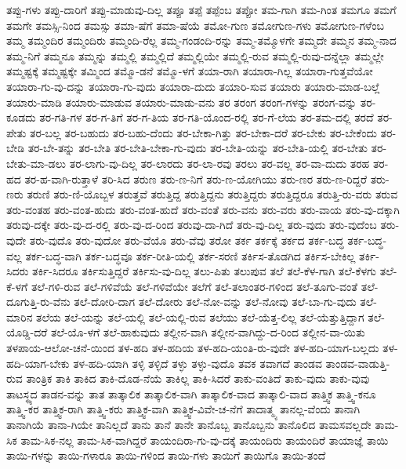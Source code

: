 {ತಪ್ಪು-ಗಳು
ತಪ್ಪು-ದಾರಿಗೆ
ತಪ್ಪು-ಮಾಡುವು-ದಿಲ್ಲ
ತಪ್ಪೂ
ತಪ್ಪೆ
ತಪ್ಪೆಂಬ
ತಪ್ಪೋ
ತಮ-ಗಾಗಿ
ತಮ-ಗಿಂತ
ತಮಗೂ
ತಮಗೆ
ತಮಗೇ
ತಮಸ್ಸಿ-ನಿಂದ
ತಮಸ್ಸು
ತಮಾ-ಷೆಗೆ
ತಮಾ-ಷೆಯೆ
ತಮೋ-ಗುಣ
ತಮೋಗುಣ-ಗಳು
ತಮೋಗುಣ-ಗಳೆಂಬ
ತಮ್ಮ
ತಮ್ಮಂದಿರ
ತಮ್ಮಂದಿರು
ತಮ್ಮಂದಿ-ರೆಲ್ಲ
ತಮ್ಮ-ಗಂಡಂದಿ-ರನ್ನು
ತಮ್ಮ-ತಮ್ಮೊಳಗೇ
ತಮ್ಮದೇ
ತಮ್ಮನ
ತಮ್ಮ-ನಾದ
ತಮ್ಮ-ನಿಗೆ
ತಮ್ಮನೂ
ತಮ್ಮನ್ನು
ತಮ್ಮಲ್ಲಿ
ತಮ್ಮಲ್ಲಿದೆ
ತಮ್ಮಲ್ಲಿಯೇ
ತಮ್ಮಲ್ಲಿ-ರುವ
ತಮ್ಮಲ್ಲಿ-ರುವು-ದನ್ನೆಲ್ಲಾ
ತಮ್ಮಲ್ಲೇ
ತಮ್ಮಷ್ಟಕ್ಕೆ
ತಮ್ಮಷ್ಟಕ್ಕೇ
ತಮ್ಮಿಂದ
ತಮ್ಮೊ-ಡನೆ
ತಮ್ಮೊ-ಳಗೆ
ತಯಾ-ರಾಗಿ
ತಯಾರಾ-ಗಿಲ್ಲ
ತಯಾರಾ-ಗುತ್ತವೆಯೋ
ತಯಾರಾ-ಗು-ವು-ದನ್ನು
ತಯಾರಾ-ಗು-ವುದು
ತಯಾರಾ-ದುದು
ತಯಾರಿ-ಸುವ
ತಯಾರು
ತಯಾರು-ಮಾಡ-ಬಲ್ಲೆ
ತಯಾರು-ಮಾಡಿ
ತಯಾರು-ಮಾಡುವ
ತಯಾರು-ಮಾಡು-ವನು
ತರ
ತರಂಗ
ತರಂಗ-ಗಳನ್ನು
ತರಂಗ-ವನ್ನು
ತರ-ಕೂಡದು
ತರ-ಗತಿ-ಗಳ
ತರ-ಗ-ತಿಗೆ
ತರ-ಗ-ತಿಯ
ತರ-ಗತಿ-ಯೊಂದ-ರಲ್ಲಿ
ತರ-ಗೆ-ಲೆಯ
ತರ-ತಮ-ದಲ್ಲಿ
ತರದೆ
ತರ-ಪೇತು
ತರ-ಬಲ್ಲ
ತರ-ಬಹುದು
ತರ-ಬಹು-ದೆಂದು
ತರ-ಬೇಕಾ-ಗಿತ್ತು
ತರ-ಬೇಕಾ-ದರೆ
ತರ-ಬೇಕು
ತರ-ಬೇಕೆಂದು
ತರ-ಬೇಡಿ
ತರ-ಬೇ-ತನ್ನು
ತರ-ಬೇತಿ
ತರ-ಬೇತಿ-ಬೇಕಾ-ಗು-ವುದು
ತರ-ಬೇತಿ-ಯನ್ನು
ತರ-ಬೇತಿ-ಯಲ್ಲಿ
ತರ-ಬೇತು
ತರ-ಬೇತು-ಮಾ-ಡಲು
ತರ-ಲಾಗು-ವು-ದಿಲ್ಲ
ತರ-ಲಾರದು
ತರ-ಲಾ-ರವು
ತರಲು
ತರ-ವಲ್ಲ
ತರ-ವಾ-ದುದು
ತರಹ
ತರ-ಹದ
ತರ-ಹ-ವಾಗಿ-ರುತ್ತಾಳೆ
ತರಿ-ಸಿದ
ತರುಣ
ತರು-ಣ-ನಿಗೆ
ತರು-ಣ-ಯೋಗಿಯು
ತರು-ಣರ
ತರು-ಣ-ರಿದ್ದರೆ
ತರು-ಣರು
ತರುಣಿ
ತರು-ಣಿ-ಯೊಬ್ಬಳ
ತರುತ್ತವೆ
ತರುತ್ತಿದ್ದ
ತರುತ್ತಿದ್ದನು
ತರುತ್ತಿದ್ದರು
ತರುತ್ತಿದ್ದರೂ
ತರುತ್ತಿ-ರು-ವರು
ತರುವ
ತರು-ವಂತಹ
ತರು-ವಂತ-ಹುದು
ತರು-ವಂತ-ಹುದೆ
ತರು-ವಂತೆ
ತರು-ವನು
ತರು-ವರು
ತರು-ವಾಯ
ತರು-ವು-ದಕ್ಕಾಗಿ
ತರುವು-ದಕ್ಕೇ
ತರು-ವು-ದ-ರಲ್ಲಿ
ತರು-ವು-ದ-ರಿಂದ
ತರುವು-ದಾ-ಗಿದೆ
ತರು-ವು-ದಿಲ್ಲ
ತರು-ವುದು
ತರು-ವುದೆಂಬ
ತರು-ವುದೇ
ತರು-ವುದೊ
ತರು-ವುದೋ
ತರು-ವೆಯೊ
ತರು-ವೆವು
ತರೋ
ತರ್ಕ
ತರ್ಕಕ್ಕೆ
ತರ್ಕದ
ತರ್ಕ-ಬದ್ಧ
ತರ್ಕ-ಬದ್ಧ-ವಲ್ಲ
ತರ್ಕ-ಬದ್ಧ-ವಾಗಿ
ತರ್ಕ-ಬದ್ಧವೂ
ತರ್ಕ-ರೀತಿ-ಯಲ್ಲಿ
ತರ್ಕ-ಸರಣಿ
ತರ್ಕಿಸ-ತೊಡಗಿದ
ತರ್ಕಿಸ-ಬೇಕಿಲ್ಲ
ತರ್ಕಿ-ಸಿದರು
ತರ್ಕಿ-ಸಿದರೂ
ತರ್ಕಿಸುತ್ತಿದ್ದರೆ
ತರ್ಕಿಸು-ವು-ದಿಲ್ಲ
ತಲು-ಪಿತು
ತಲುಪುವ
ತಲೆ
ತಲೆ-ಕೆಳ-ಗಾಗಿ
ತಲೆ-ಕೆಳಗು
ತಲೆ-ಕೆ-ಳಗೆ
ತಲೆ-ಗಳಿ-ರುವ
ತಲೆ-ಗಳಿವೆಯೆ
ತಲೆ-ಗಳಿವೆಯೇ
ತಲೆಗೆ
ತಲೆ-ತಲಾಂತರ-ಗಳಿಂದ
ತಲೆ-ತೂಗು-ವಂತೆ
ತಲೆ-ದೂಗುತ್ತಿ-ರು-ವೆನು
ತಲೆ-ದೋರಿ-ದಾಗ
ತಲೆ-ದೋರು
ತಲೆ-ನೋ-ವನ್ನು
ತಲೆ-ನೋವು
ತಲೆ-ಬಾ-ಗು-ವುದು
ತಲೆ-ಮಾರಿನ
ತಲೆಯ
ತಲೆ-ಯನ್ನು
ತಲೆ-ಯಲ್ಲಿ
ತಲೆ-ಯಲ್ಲಿ-ರುವ
ತಲೆಯು
ತಲೆ-ಯೆತ್ತ-ಲಿಲ್ಲ
ತಲೆ-ಯೆತ್ತುತ್ತಿದ್ದಾಗ
ತಲೆ-ಯೊಡ್ಡಿ-ದರೆ
ತಲೆ-ಯೊ-ಳಗೆ
ತಲೆ-ಹಾಕುವುದು
ತಲ್ಲೀನ-ವಾಗಿ
ತಲ್ಲೀನ-ವಾಗಿದ್ದು-ದ-ರಿಂದ
ತಲ್ಲೀನ-ವಾ-ಯಿತು
ತಳಪಾಯ-ಆಲೋ-ಚನೆ-ಯಿಂದ
ತಳ-ಹದಿ
ತಳ-ಹದಿಯ
ತಳ-ಹದಿ-ಯಂತಿ-ರು-ವುದೇ
ತಳ-ಹದಿ-ಯಾಗ-ಬಲ್ಲದು
ತಳ-ಹದಿ-ಯಾಗ-ಬೇಕು
ತಳ-ಹದಿ-ಯಾಗಿ
ತಳ್ಳಿ
ತಳ್ಳಿದೆ
ತಳ್ಳು
ತಳ್ಳು-ವುದೊ
ತವಕ
ತವಾಗದೆ
ತಾಂಡವ
ತಾಂಡವ-ವಾಡುತ್ತಿ-ರುವ
ತಾಂತ್ರಿಕ
ತಾಕಿ
ತಾಕಿದ
ತಾಕಿ-ದೊಡ-ನೆಯೆ
ತಾಕಿಲ್ಲ
ತಾಕಿ-ಸಿದರೆ
ತಾಕು-ವಂತಿದೆ
ತಾಕು-ವುದು
ತಾಕು-ವುವು
ತಾಟಸ್ಥ್ಯದ
ತಾಡನ-ವನ್ನು
ತಾತ
ತಾತ್ಕಾಲಿಕ
ತಾತ್ಕಾಲಿಕ-ವಾಗಿ
ತಾತ್ಕಾಲಿಕ-ವಾದ
ತಾತ್ಕಾಲಿ-ವಾದ
ತಾತ್ತ್ವಿಕ
ತಾತ್ತ್ವಿ-ಕನೂ
ತಾತ್ತ್ವಿ-ಕರ
ತಾತ್ತ್ವಿಕ-ರಾಗಿ
ತಾತ್ತ್ವಿ-ಕರು
ತಾತ್ತ್ವಿಕ-ವಾಗಿ
ತಾತ್ತ್ವಿಕ-ವಿವೇ-ಚ-ನೆಗೆ
ತಾದಾತ್ಮ್ಯ
ತಾನಲ್ಲ-ವೆಂದು
ತಾನಾಗಿ
ತಾನಾಗಿಯೆ
ತಾನಾ-ಗಿಯೇ
ತಾನಿಲ್ಲದೆ
ತಾನು
ತಾನೆ
ತಾನೇ
ತಾನೊಬ್ಬ
ತಾನೊಬ್ಬನು
ತಾನೊಲಿದ
ತಾಮಸವಲ್ಲದೇ
ತಾಮ-ಸಿಕ
ತಾಮ-ಸಿಕ-ನಲ್ಲ
ತಾಮ-ಸಿಕ-ವಾಗಿದ್ದರೆ
ತಾಯಂದಿರಾ-ಗು-ವು-ದಕ್ಕೆ
ತಾಯಂದಿರು
ತಾಯಂದಿರೆ
ತಾಯಾಜ್ಞೆ
ತಾಯಿ
ತಾಯಿ-ಗಳನ್ನು
ತಾಯಿ-ಗಳಾರೂ
ತಾಯಿ-ಗಳಿಂದ
ತಾಯಿ-ಗಳು
ತಾಯಿಗೆ
ತಾಯಿಗೊ
ತಾಯಿ-ತಂದೆ
}
